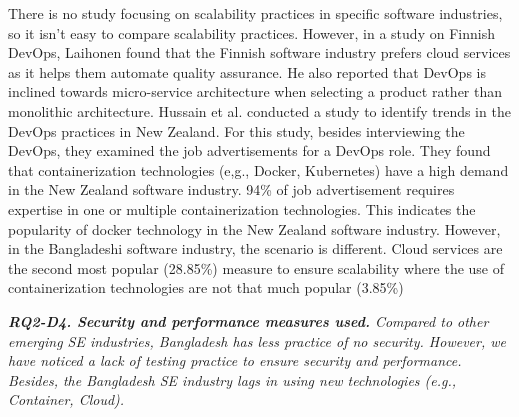 There is no study focusing on scalability practices in specific software industries, so it isn't easy to compare scalability practices. However, in a study on Finnish DevOps, Laihonen\citep{Laihonen2018} found that the Finnish software industry prefers cloud services as it helps them automate quality assurance. He also reported that DevOps is inclined towards micro-service architecture when selecting a product rather than monolithic architecture. Hussain et al.\citep{Hussain2017} conducted a study to identify trends in the DevOps practices in New Zealand. For this study, besides interviewing the DevOps, they examined the job advertisements for a DevOps role. They found that containerization technologies (e,g., Docker, Kubernetes) have a high demand in the New Zealand software industry. 94\% of job advertisement requires expertise in one or multiple containerization technologies. This indicates the popularity of docker technology in the New Zealand software industry. However, in the Bangladeshi software industry, the scenario is different. Cloud services are the second most popular (28.85\%) measure to ensure scalability where the use of containerization technologies are not that much popular (3.85\%)

\begin{tcolorbox}[flushleft upper,boxrule=1pt,arc=0pt,left=0pt,right=0pt,top=0pt,bottom=0pt,colback=white,after=\ignorespacesafterend\par\noindent]
\nd\it{\bf{RQ2-D4. Security and performance measures used.}}
Compared to other emerging SE industries, Bangladesh has less practice of no security. However, we have noticed a lack of testing practice to ensure security and performance. Besides, the Bangladesh SE industry lags in using new technologies (e.g., Container, Cloud).
\end{tcolorbox}